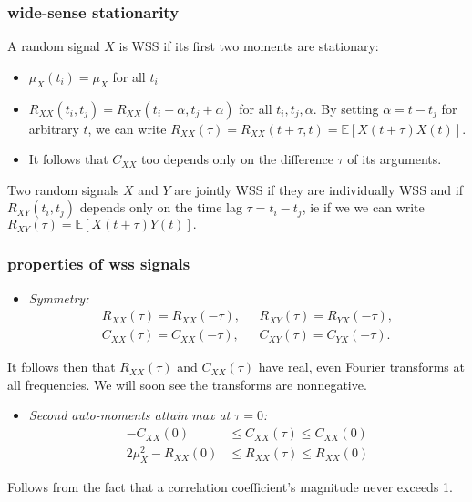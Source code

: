 \documentclass{beamer}
\begin{document}
\begin{frame}[fragile]
	\frametitle{wide-sense stationarity}
	A random signal $X$ is WSS if its first two moments are stationary:
	\begin{itemize}
		\item $\mu_X(t_i) = \mu_X$ for all $t_i$
		\item $R_{XX}(t_i, t_j) = R_{XX}(t_i+\alpha, t_j+\alpha)$ for all $t_i, t_j, \alpha$. By setting $\alpha = t-t_j$ for arbitrary $t$, we can write $R_{XX}(\tau) =R_{XX}(t+\tau, t) = \mathbb{E}[X(t+\tau)X(t)].$
		\item It follows that $C_{XX}$ too depends only on the difference $\tau$ of its arguments.
	\end{itemize}

	Two random signals $X$ and $Y$ are jointly WSS if they are individually WSS and if $R_{XY}(t_i, t_j)$ depends only on the time lag $\tau = t_i-t_j$, ie if we we can write $R_{XY}(\tau) = \mathbb{E}[X(t+\tau)Y(t)].$

\end{frame}

\begin{frame}[fragile]
	\frametitle{properties of wss signals}
	\begin{itemize}
		\item \emph{Symmetry:} \begin{align*} R_{XX}(\tau) = R_{XX}(-\tau),\text{ }& R_{XY}(\tau) = R_{YX}(-\tau),\\ C_{XX}(\tau) = C_{XX}(-\tau),\text{ }& C_{XY}(\tau) = C_{YX}(-\tau).\end{align*}
	\end{itemize}

	        It follows then that $R_{XX}(\tau)$ and $C_{XX}(\tau)$ have real, even Fourier transforms at all frequencies. We will soon see the transforms are nonnegative.

	\begin{itemize}
		\item \emph{Second auto-moments attain max at $\tau = 0$:}
			\begin{align*} -C_{XX}(0) & \leq C_{XX}(\tau) \leq C_{XX}(0)\\
		2\mu_X^2-R_{XX}(0) & \leq R_{XX}(\tau) \leq R_{XX}(0)\end{align*}
	\end{itemize}
	Follows from the fact that a correlation coefficient's magnitude never exceeds 1.

\end{frame}
\end{document}
